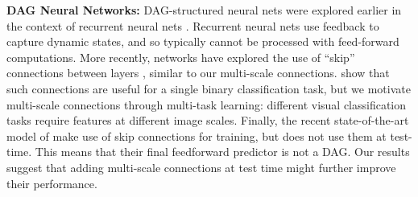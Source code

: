\documentclass[10pt,twocolumn,letterpaper]{article}
\begin{document}

{\bf DAG Neural Networks:} DAG-structured neural nets were explored earlier in the context of recurrent neural nets \cite{baldi2003principled,graves2009offline}. Recurrent neural nets use feedback to capture dynamic states, and so typically cannot be processed with feed-forward computations. %
More recently, networks have explored the use of ``skip'' connections between layers \cite{raiko-aistats-12,GoogLeNet,sermanet2013pedestrian}, similar to our multi-scale connections. \cite{raiko-aistats-12} show that such connections are useful for a single binary classification task, but we motivate multi-scale connections through multi-task learning: different visual classification tasks require features at different image scales. %
Finally, the recent state-of-the-art model of \cite{GoogLeNet} make use of skip connections for training, but does not use them at test-time. This means that their final feedforward predictor is not a DAG. Our results suggest that adding multi-scale connections at test time might further improve their performance.
\end{document}
